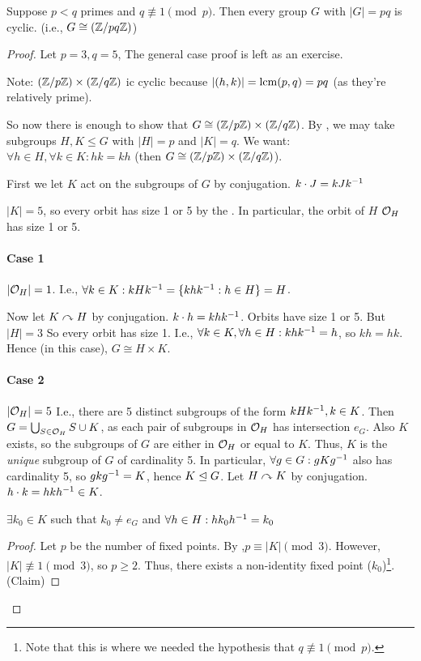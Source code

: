 \documentclass[notes.tex]{subfiles}
\begin{document}

\begin{theorem}
	Suppose $p<q$ primes and $q \not\equiv 1\pmod p$. Then every group $G$ with $|G| = pq$ is cyclic. (i.e., $G\cong (\mathbb{Z}/{pq}\mathbb{Z})$)
\end{theorem}
\begin{proof}
	Let $p=3, q =5$, The general case proof is left as an exercise.

	Note: $(\mathbb{Z}/{p}\mathbb{Z}) \times (\mathbb{Z}/{q}\mathbb{Z})$ ic cyclic because $|(h, k)| = \operatorname{\mathrm{lcm}} (p, q) = pq$ (as they're relatively prime).

	So now there is enough to show that $G\cong (\mathbb{Z}/{p}\mathbb{Z}) \times (\mathbb{Z}/{q}\mathbb{Z})$.
	By , we may take subgroups $H, K\le G$ with $|H| = p$ and $|K| = q$.
	We want: $\forall h\in H, \forall k\in K: hk = kh$ (then $G\cong (\mathbb{Z}/{p}\mathbb{Z}) \times (\mathbb{Z}/{q}\mathbb{Z})$).

	First we let $K$ act on the subgroups of $G$ by conjugation. $k\cdot J = kJ{k}^{-1}$

	$|K| = 5$, so every orbit has size 1 or 5 by the . In particular, the orbit of $H$ $\mathcal{O}_H$ has size 1 or 5.

	\paragraph{Case 1} $|\mathcal{O}_H| = 1$. I.e., $\forall k\in K: kH{k}^{-1} = \{kh{k}^{-1} : h\in H\} = H$.

	Now let $K\curvearrowright H$ by conjugation. $k\cdot h = kh{k}^{-1}$. Orbits have size 1 or 5. But $|H| = 3$ So every orbit has size 1. I.e., $\forall k\in K, \forall h\in H: kh{k}^{-1} = h$, so $kh = hk$. Hence (in this case), $G\cong H\times K$.

	\paragraph{Case 2} $|\mathcal{O}_H| = 5$ I.e., there are 5 distinct subgroups of the form $kH{k}^{-1}, k\in K$. Then $G = \bigcup_{S\in \mathcal{O}_H}S \cup K$, as each pair of subgroups in $\mathcal{O}_H$ has intersection $e_G$. Also $K$ exists, so the subgroups of $G$ are either in $\mathcal{O}_H$ or equal to $K$.
	Thus, $K$ is the \emph{unique} subgroup of $G$ of cardinality 5. In particular, $\forall g\in G: gK{g}^{-1}$ also has cardinality 5, so $gk{g}^{-1} = K$, hence $K\trianglelefteq G$.
	Let $H\curvearrowright K$ by conjugation. $h\cdot k = hk{h}^{-1} \in K$. 
	
	\begin{claim}[1]
		$\exists k_0\in K$ such that $k_0\ne e_G$ and $\forall h\in H: hk_0{h}^{-1} = k_0$
	\end{claim} 
	\begin{proof}
		Let $p$ be the number of fixed points. 
		By ,$ p\equiv |K|\pmod 3$.
		However, $|K|\not\equiv 1\pmod 3$, so $p \ge 2$.
		Thus, there exists a non-identity fixed point ($k_0$)\footnote{Note that this is where we needed the hypothesis that $q\not\equiv 1\pmod p$.}.
		\qedhere(Claim)
	\end{proof}


\end{proof}
\end{document}

